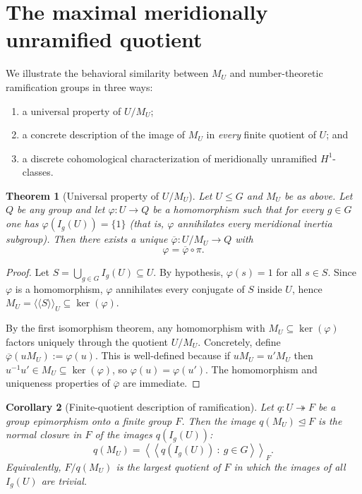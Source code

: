 \documentclass[11pt]{article}
\newtheorem{theorem}{Theorem}[section]
\newtheorem{corollary}[theorem]{Corollary}
\begin{document}
	\section{The maximal meridionally unramified quotient}
	We illustrate the behavioral similarity between $M_U$ and number-theoretic ramification groups in three ways:
	\begin{enumerate}
		\item a universal property of $U/M_U$;
		\item a concrete description of the image of $M_U$ in \emph{every} finite quotient of $U$; and
		\item a discrete cohomological characterization of meridionally unramified $H^1$-classes.
	\end{enumerate}
	
	\begin{theorem}[Universal property of $U/M_U$]\label{thm:universal}
		Let $U\le G$ and $M_U$ be as above. Let $Q$ be any group and let $\varphi:U\to Q$ be a homomorphism such that for every $g\in G$ one has $\varphi(I_g(U))=\{1\}$ (that is, $\varphi$ annihilates every meridional inertia subgroup). Then there exists a unique $\overline{\varphi}:U/M_U\to Q$ with
		\[ 	\varphi = \overline{\varphi}\circ \pi.\]
	\end{theorem}
	
	\begin{proof}
		Let $S=\bigcup_{g\in G} I_g(U)\subseteq U$. By hypothesis, $\varphi(s)=1$ for all $s\in S$.
		Since $\varphi$ is a homomorphism, $\varphi$ annihilates every conjugate of $S$ inside $U$, hence $M_U=\langle\!\langle S\rangle\!\rangle_U\subseteq \ker(\varphi)$.
		
		By the first isomorphism theorem, any homomorphism with $M_U\subseteq\ker(\varphi)$ factors uniquely through the quotient $U/M_U$. Concretely, define $\overline{\varphi}(uM_U):=\varphi(u)$. This is well-defined because if $uM_U=u'M_U$ then $u^{-1}u'\in M_U\subseteq\ker(\varphi)$, so $\varphi(u)=\varphi(u')$. The homomorphism and uniqueness properties of $\overline\varphi$ are immediate.
	\end{proof}
	
	\begin{corollary}[Finite-quotient description of ramification]\label{cor:finitequot}
		Let $q:U\twoheadrightarrow F$ be a group epimorphism onto a finite group $F$. Then the image $q(M_U)\trianglelefteq F$ is the normal closure in $F$ of the images $q(I_g(U))$:
		\[q(M_U)=\left\langle\!\left\langle q(I_g(U))\ :\ g\in G\right\rangle\!\right\rangle_F.\]
		Equivalently, $F/q(M_U)$ is the largest quotient of $F$ in which the images of all $I_g(U)$ are trivial.
	\end{corollary}
	
\end{document}
